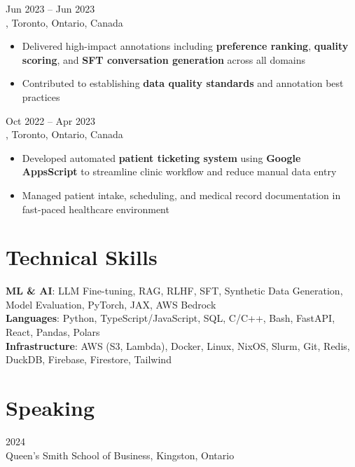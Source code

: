 \documentclass[letterpaper,10pt]{article}
\begin{document}
\hspace{0.15in}{\large\bfseries Data Quality Specialist} \hfill {\small Jun 2023 -- Jun 2023} \\
\hspace{0.15in}{\bfseries Cohere}, Toronto, Ontario, Canada
\vspace{-1pt}
\begin{itemize}[leftmargin=0.35in, itemsep=-1pt, topsep=1pt, labelsep=0.035in]
\item Delivered high-impact annotations including \textbf{preference ranking}, \textbf{quality scoring}, and \textbf{SFT conversation generation} across all domains
\item Contributed to establishing \textbf{data quality standards} and annotation best practices
\end{itemize}
\vspace{1pt}

\hspace{0.15in}{\large\bfseries Medical Assistant} \hfill {\small Oct 2022 -- Apr 2023} \\
\hspace{0.15in}{\bfseries P\&A Medical}, Toronto, Ontario, Canada
\vspace{-1pt}
\begin{itemize}[leftmargin=0.35in, itemsep=-1pt, topsep=1pt, labelsep=0.035in]
\item Developed automated \textbf{patient ticketing system} using \textbf{Google AppsScript} to streamline clinic workflow and reduce manual data entry
\item Managed patient intake, scheduling, and medical record documentation in fast-paced healthcare environment
\end{itemize}

\section{Technical Skills}

\hspace{0.15in}\textbf{ML \& AI}: LLM Fine-tuning, RAG, RLHF, SFT, Synthetic Data Generation, Model Evaluation, PyTorch, JAX, AWS Bedrock \\
\hspace{0.15in}\textbf{Languages}: Python, TypeScript/JavaScript, SQL, C/C++, Bash, FastAPI, React, Pandas, Polars \\
\hspace{0.15in}\textbf{Infrastructure}: AWS (S3, Lambda), Docker, Linux, NixOS, Slurm, Git, Redis, DuckDB, Firebase, Firestore, Tailwind

\section{Speaking}

\hspace{0.15in}{\bfseries Guest Lecturer on AI and Synthetic Data Generation for MMA Program} \hfill {\small 2024} \\
\hspace{0.15in}Queen's Smith School of Business, Kingston, Ontario
\end{document}

